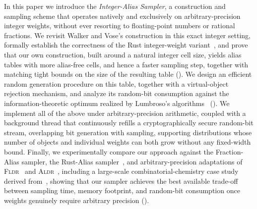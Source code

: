 In this paper we introduce the \emph{Integer-Alias Sampler}, a construction and sampling scheme that
operates natively and exclusively on arbitrary-precision integer weights, without ever resorting to
floating-point numbers or rational fractions. We revisit Walker and Vose's construction in this exact
integer setting, formally establish the correctness of the Rust integer-weight variant~\cite{Rust25}, and
prove that our own construction, built around a natural integer cell size, yields alias tables with more
alias-free cells, and hence a faster sampling step, together with matching tight bounds on the size of the
resulting table (). We design an efficient random generation procedure on this
table, together with a virtual-object rejection mechanism, and analyze its random-bit consumption against
the information-theoretic optimum realized by Lumbroso's algorithms~\cite{Lumbroso13} (). We
implement all of the above under arbitrary-precision arithmetic, coupled with a background thread that
continuously refills a cryptographically secure random-bit stream, overlapping bit generation with sampling, supporting
distributions whose number of objects and individual weights can both grow without any fixed-width bound.
Finally, we experimentally compare our approach against the Fraction-Alias sampler, the Rust-Alias
sampler~\cite{Rust25}, and arbitrary-precision adaptations of \textsc{Fldr}~\cite{SFRM19} and
\textsc{Aldr}~\cite{DS26}, including a large-scale combinatorial-chemistry case study derived
from~\cite{MR25,SSHL26}, showing that our sampler achieves the best available trade-off between sampling
time, memory footprint, and random-bit consumption once weights genuinely require arbitrary precision
().
